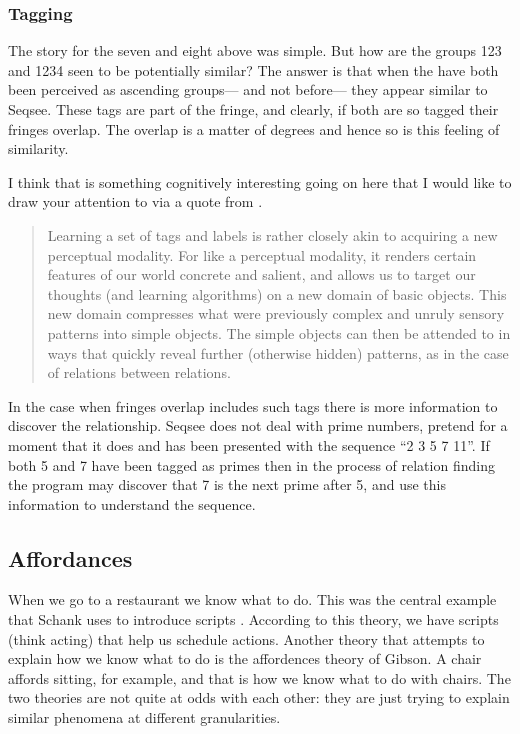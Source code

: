 \subsubsection{Tagging}
\label{sec:tagging}

The story for the seven and eight above was simple.  But how are the groups 123 and 1234 seen to be potentially similar?  The answer is that when the have both been perceived as ascending groups--- and not before--- they appear similar to Seqsee.  These tags are part of the fringe, and clearly, if both are so tagged their fringes overlap.  The overlap is a matter of degrees and hence so is this feeling of similarity.

I think that is something cognitively interesting going on here that I would like to draw your attention to via a quote from \cite{Clark:MindWare}.

\begin{quote}
Learning a set of tags and labels is rather closely akin to acquiring a new perceptual modality.  For like a perceptual modality, it renders certain features of our world concrete and salient, and allows us to target our thoughts (and learning algorithms) on a new domain of basic objects.  This new domain compresses what were previously complex and unruly sensory patterns into simple objects.  The simple objects can then be attended to in ways that quickly reveal further (otherwise hidden) patterns, as in the case of relations between relations.
\end{quote}


In the case when fringes overlap includes such tags there is more information to discover the relationship.  Seqsee does not deal with prime numbers, pretend for a moment that it does and has been presented with the sequence ``2 3 5 7 11''. If both 5 and 7 have been tagged as primes then in the process of relation finding the program may discover that 7 is the next prime after 5, and use this information to understand the sequence.


\subsection{Affordances}
\label{sec:affordances}

When we go to a restaurant we know what to do.  This was the central example that Schank uses to introduce scripts \cite{Schank+Abelson}.  According to this theory, we have scripts (think acting) that help us schedule actions.  Another theory that attempts to explain how we know what to do is the affordences theory of Gibson. A chair affords sitting, for example, and that is how we know what to do with chairs.  The two theories are not quite at odds with each other: they are just trying to explain similar phenomena at different granularities.


